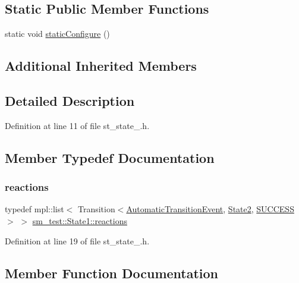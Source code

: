 \subsection*{Static Public Member Functions}
\begin{DoxyCompactItemize}
\item 
static void \hyperlink{structsm__test_1_1State1_aa6fb700b8ffff0c82ae29d17933393d1}{static\+Configure} ()
\end{DoxyCompactItemize}
\subsection*{Additional Inherited Members}


\subsection{Detailed Description}


Definition at line 11 of file st\+\_\+state\+\_.\+h.



\subsection{Member Typedef Documentation}
\mbox{\label{structsm__test_1_1State1_a01f0fc77a7b86701dfbfb03323706218}} 
\subsubsection{\texorpdfstring{reactions}{reactions}}
{\footnotesize\ttfamily typedef mpl\+::list$<$ Transition$<$\hyperlink{structsm__test_1_1AutomaticTransitionEvent}{Automatic\+Transition\+Event}, \hyperlink{structsm__test_1_1State2}{State2}, \hyperlink{classSUCCESS}{S\+U\+C\+C\+E\+SS}$>$ $>$ \hyperlink{structsm__test_1_1State1_a01f0fc77a7b86701dfbfb03323706218}{sm\+\_\+test\+::\+State1\+::reactions}}



Definition at line 19 of file st\+\_\+state\+\_.\+h.



\subsection{Member Function Documentation}
\mbox{\label{structsm__test_1_1State1_abf2e4eb155f482dd26debcf71111f84d}} 
